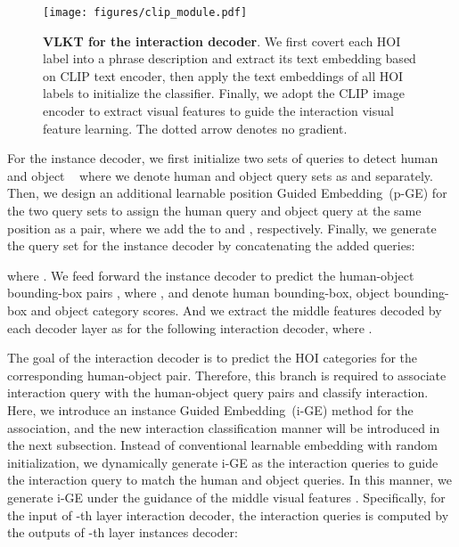 \documentclass[10pt,twocolumn,letterpaper]{article}
\newcommand{\bd}[1]{\textbf{#1}}
\begin{document}
\begin{figure}[t]
\begin{center}
   \texttt{[image: figures/clip\_module.pdf]}
\end{center}
\vspace{-3.5mm}
   \caption{\bd{VLKT for the interaction decoder}. We first covert each HOI label into a phrase description and extract its text embedding based on CLIP text encoder, then apply the text embeddings of all HOI labels to initialize the classifier. Finally, we adopt the CLIP image encoder to extract visual features to guide the interaction visual feature learning. The dotted arrow denotes no gradient.}
  \vspace{-3.5mm}
\label{fig:clip}
\end{figure}

For the instance decoder, we first initialize two sets of queries to detect human and object ~\cite{dong2021visual} where we denote human and object query sets as  and  separately. Then, we design an additional learnable position Guided Embedding~(p-GE)  for the two query sets to assign the human query and object query at the same position as a pair, where we add the  to  and , respectively. Finally, we generate the query set for the instance decoder by concatenating the added queries:

where . We feed  forward the instance decoder to predict the human-object bounding-box pairs , where ,   and  denote human bounding-box, object bounding-box and object category scores. And we extract the middle features decoded by each decoder layer as  for the following interaction decoder, where . 


The goal of the interaction decoder is to predict the HOI categories for the corresponding human-object pair. Therefore, this branch is required to associate interaction query with the human-object query pairs and classify interaction. Here, we introduce an instance Guided Embedding~(i-GE) method for the association, and the new interaction classification manner will be introduced in the next subsection.
Instead of conventional learnable embedding with random initialization, we dynamically generate i-GE as the interaction queries to guide the interaction query to match the human and object queries.
In this manner, we generate i-GE under the guidance of the middle visual features . Specifically, for the input of -th layer interaction decoder, the interaction queries  is computed by the outputs of -th layer instances decoder:
\end{document}
